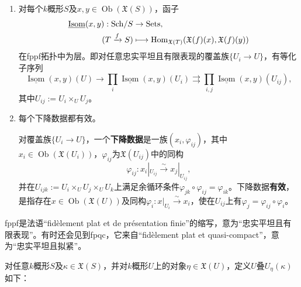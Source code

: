 \begin{enumerate}[label=(\roman*)]
\item 对每个$k$概形$S$及$x,y\in\operatorname{Ob}(\mathfrak X(S))$，函子
\[\begin{aligned}
\underline{\operatorname{Isom}}(x,y):\mathrm{Sch}/S&\to\mathrm{Sets},\\
(T\xrightarrow f S)&\longmapsto\operatorname{Hom}_{\mathfrak X(T)}(\mathfrak X(f)(x),\mathfrak X(f)(y))
\end{aligned}\]
在fppf拓扑中为层。即对任意忠实平坦且有限表现的覆盖族$\{U_i\to U\}$，有等化子序列
\[\underline{\operatorname{Isom}}(x,y)(U)\to\prod_i\underline{\operatorname{Isom}}(x,y)(U_i)\rightrightarrows\prod_{i,j}\underline{\operatorname{Isom}}(x,y)(U_{ij}),\]
其中$U_{ij}:=U_i\times_UU_j$。
\item 每个下降数据都有效。

对覆盖族$\{U_i\to U\}$，一个\textbf{下降数据}是一族$(x_i,\varphi_{ij})$，其中$x_i\in\operatorname{Ob}(\mathfrak X(U_i))$，$\varphi_{ij}$为$\mathfrak X(U_{ij})$中的同构
\[\varphi_{ij}:x_i|_{U_{ij}}\xrightarrow{\sim}x_j|_{U_{ij}},\]
并在$U_{ijk}:=U_i\times_UU_j\times_UU_k$上满足余循环条件$\varphi_{jk}\circ\varphi_{ij}=\varphi_{ik}$。下降数据\textbf{有效}，是指存在$x\in\operatorname{Ob}(\mathfrak X(U))$及同构$\varphi_i:x|_{U_i}\xrightarrow{\sim}x_i$，使在$U_{ij}$上有$\varphi_j=\varphi_{ij}\circ\varphi_i$。
\end{enumerate}
\begin{note}[L11S3O1]
fppf是法语“fidèlement plat et de présentation finie”的缩写，意为“忠实平坦且有限表现”。有时还会见到fpqc，它来自“fidèlement plat et quasi-compact”，意为“忠实平坦且拟紧”。
\end{note}
对任意$k$概形$S$及$\kappa\in\mathfrak X(S)$，并对$k$概形$U$上的对象$\eta\in\mathfrak X(U)$，定义$U$叠$U_\eta(\kappa)$如下：
